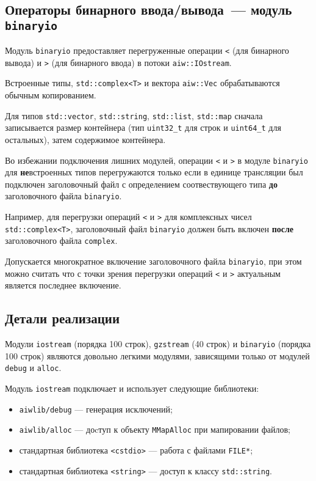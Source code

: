 \subsection{Операторы бинарного ввода/вывода~--- модуль {\tt binaryio}}
Модуль \verb'binaryio' предоставляет перегруженные операции \verb'<' (для бинарного вывода) и \verb'>' (для бинарного ввода)
в потоки \verb'aiw::IOstream'.

Встроенные типы, \verb'std::complex<T>' и вектора \verb'aiw::Vec' обрабатываются обычным копированием.

Для типов \verb'std::vector', \verb'std::string', \verb'std::list', \verb'std::map' сначала записывается размер контейнера
(тип \verb'uint32_t' для строк и \verb'uint64_t' для остальных), затем содержимое контейнера.

Во избежании подключения лишних модулей, операции \verb'<' и \verb'>' в модуле \verb'binaryio'
для {\bf не}встроенных типов перегружаются только если в единице трансляции был подключен
заголовочный файл с определением соотвествующего типа {\bf до} заголовочного файла \verb'binaryio'.

Например, для перегрузки операций \verb'<' и \verb'>' для комплексных чисел \verb'std::complex<T>',
заголовочный файл \verb'binaryio' должен быть включен {\bf после} заголовочного файла \verb'complex'.

Допускается многократное включение заголовочного файла \verb'binaryio', при этом можно считать что с точки
зрения перегрузки операций \verb'<' и \verb'>' актуальным является
последнее включение.

\subsection{Детали реализации}
Модули \verb'iostream' (порядка 100 строк), \verb'gzstream' (40 строк) и \verb'binaryio' (порядка 100 строк)
являются довольно легкими модулями, зависящими только от модулей \verb'debug' и \verb'alloc'.

Модуль \verb'iostream' подключает и использует следующие библиотеки:
\begin{itemize}
\item \verb'aiwlib/debug' --- генерация исключений;
\item \verb'aiwlib/alloc' --- доcтуп к объекту \verb'MMapAlloc' при мапировании файлов;
\item стандартная библиотека \verb'<cstdio>' --- работа с файлами \verb'FILE*';
\item стандартная библиотека \verb'<string>' --- доступ к классу \verb'std::string'.
\end{itemize}

